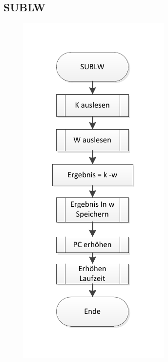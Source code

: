 \newpage
\subsection{SUBLW}



\begin{figure}[h]
\centering
\includegraphics[scale=0.7]{Diag/SUBLW.pdf}
\end{figure}
